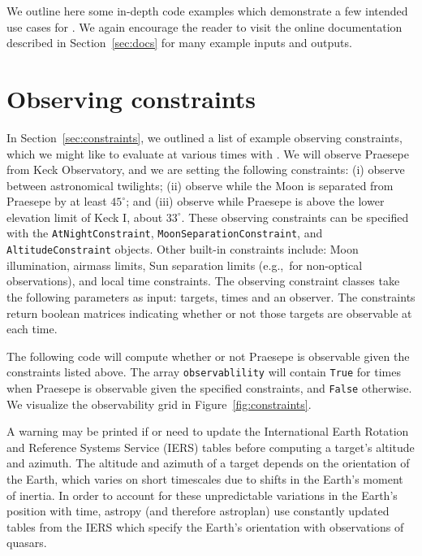 \begin{subappendices}
We outline here some in-depth code examples which demonstrate a few intended use cases for \astroplan. We again encourage the reader to visit the online documentation described in Section~\ref{sec:docs} for many example inputs and outputs.

\section{Observing constraints} \label{sec:constraints_example}
In Section~\ref{sec:constraints}, we outlined a list of example observing constraints, which we might like to evaluate at various times with \astroplan. We will observe Praesepe from Keck Observatory, and we are setting the following constraints: (i) observe between astronomical twilights; (ii) observe while the Moon is separated from Praesepe by at least $45^\circ$; and (iii) observe while Praesepe is above the lower elevation limit of Keck I, about $33^\circ$. These observing constraints can be specified with the \texttt{AtNightConstraint}, \texttt{MoonSeparationConstraint}, and \texttt{AltitudeConstraint} objects. Other built-in constraints include: Moon illumination, airmass limits, Sun separation limits (e.g.,~for non-optical observations), and local time constraints. The observing constraint classes take the following parameters as input: targets, times and an observer. The constraints return boolean matrices indicating whether or not those targets are observable at each time. 

The following code will compute whether or not Praesepe is observable given the constraints listed above. The array \texttt{observablility} will contain \texttt{True} for times when Praesepe is observable given the specified constraints, and \texttt{False} otherwise. We visualize the observability grid in Figure~\ref{fig:constraints}.

A warning may be printed if \astropy or \astroplan need to update the International Earth Rotation and Reference Systems Service (IERS) tables before computing a target's altitude and azimuth. The altitude and azimuth of a target depends on the orientation of the Earth, which varies on short timescales due to shifts in the Earth's moment of inertia. In order to account for these unpredictable variations in the Earth's position with time, astropy (and therefore astroplan) use constantly updated tables from the IERS which specify the Earth's orientation with observations of quasars. 


\end{subappendices}
